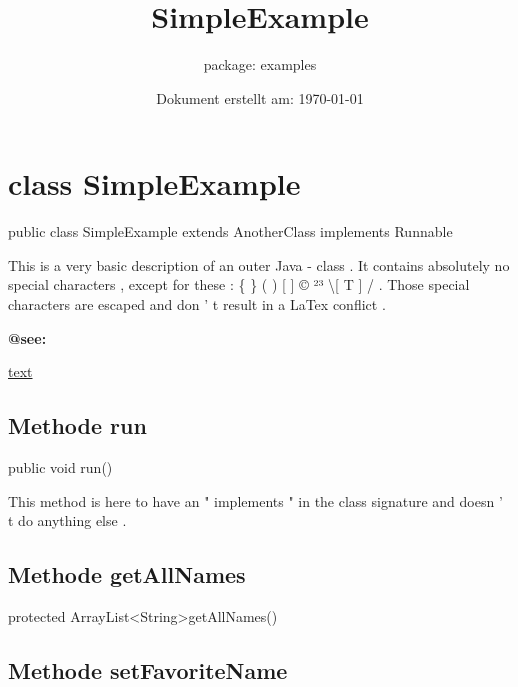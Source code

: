 \documentclass[12pt]{scrreprt}
\title{SimpleExample}
\subtitle{package: examples}
\date{Dokument erstellt am: \today}
\begin{document}

\maketitle
\newpage


\tableofcontents
\newpage

\setcounter{page}{0}


\chapter{class SimpleExample}
\label{examples.SimpleExample}




public class SimpleExample extends AnotherClass implements Runnable


This is a very basic description of an outer Java - class . It contains absolutely no special characters , except for these : \{ \} ( ) [ ] © ²³ \textbackslash [ T ] / . Those special characters are escaped and don ' t result in a LaTex conflict .


\textbf{@see:}

\quad\quad\hyperref[examples.SimpleExample.My22Class:getx]{text}

\section{Methode run}
\label{examples.SimpleExample:run}




public void run()


This method is here to have an " implements " in the class signature and doesn ' t do anything else .



\section{Methode getAllNames}
\label{examples.SimpleExample:getAllNames}




protected ArrayList\textless String\textgreater  getAllNames()






\section{Methode setFavoriteName}
\label{examples.SimpleExample:setFavoriteName}
\end{document}
